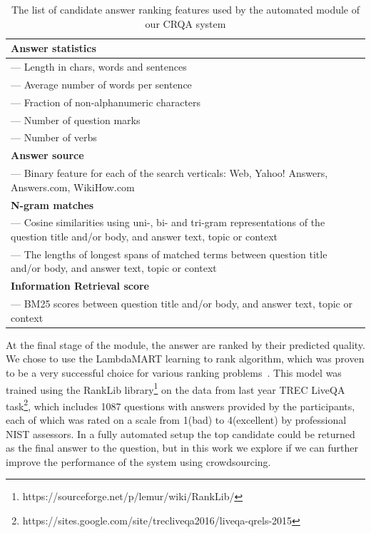\begin{table}[ht]
\centering
\begin{tabular}{| p{8cm} |}
\hline
\textbf{Answer statistics} \\
\hline
--- Length in chars, words and sentences \\
--- Average number of words per sentence \\
--- Fraction of non-alphanumeric characters  \\
--- Number of question marks \\
--- Number of verbs  \\
\hline
\textbf{Answer source} \\
\hline
--- Binary feature for each of the search verticals: Web, Yahoo! Answers, Answers.com, WikiHow.com \\
\hline
\textbf{N-gram matches}\\
\hline
--- Cosine similarities using uni-, bi- and tri-gram representations of the question title and/or body, and answer text, topic or context\\
--- The lengths of longest spans of matched terms between question title and/or body, and answer text, topic or context\\
\hline
\textbf{Information Retrieval score}\\
\hline
--- BM25 scores between question title and/or body, and answer text, topic or context\\ 
\hline
\end{tabular}
\caption{The list of candidate answer ranking features used by the automated module of our CRQA system}
\label{table:features}
\end{table}

At the final stage of the module, the answer are ranked by their predicted quality.
We chose to use the LambdaMART learning to rank algorithm, which was proven to be a very successful choice for various ranking problems~\cite{burges2010ranknet}.
This model was trained using the RankLib library\footnote{https://sourceforge.net/p/lemur/wiki/RankLib/} on the data from last year TREC LiveQA task\footnote{https://sites.google.com/site/trecliveqa2016/liveqa-qrels-2015}, which includes 1087 questions with answers provided by the participants, each of which was rated on a scale from 1(bad) to 4(excellent) by professional NIST assessors.
In a fully automated setup the top candidate could be returned as the final answer to the question, but in this work we explore if we can further improve the performance of the system using crowdsourcing.

